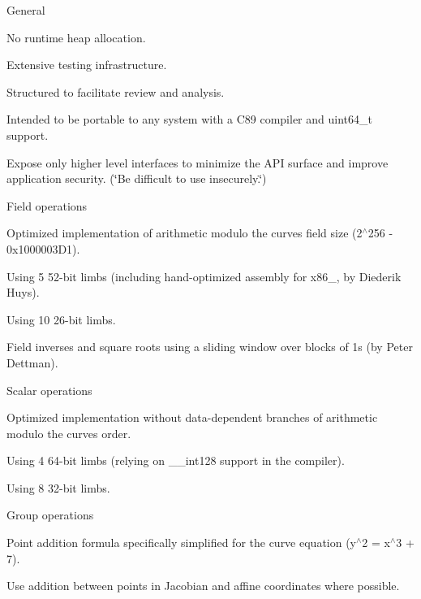 \begin{DoxyItemize}
\item General
\begin{DoxyItemize}
\item No runtime heap allocation.
\item Extensive testing infrastructure.
\item Structured to facilitate review and analysis.
\item Intended to be portable to any system with a C89 compiler and uint64\+\_\+t support.
\item Expose only higher level interfaces to minimize the A\+P\+I surface and improve application security. (\char`\"{}\+Be difficult to use insecurely.\char`\"{})
\end{DoxyItemize}
\item Field operations
\begin{DoxyItemize}
\item Optimized implementation of arithmetic modulo the curve\textquotesingle{}s field size (2$^\wedge$256 -\/ 0x1000003\+D1).
\begin{DoxyItemize}
\item Using 5 52-\/bit limbs (including hand-\/optimized assembly for x86\+\_, by Diederik Huys).
\item Using 10 26-\/bit limbs.
\end{DoxyItemize}
\item Field inverses and square roots using a sliding window over blocks of 1s (by Peter Dettman).
\end{DoxyItemize}
\item Scalar operations
\begin{DoxyItemize}
\item Optimized implementation without data-\/dependent branches of arithmetic modulo the curve\textquotesingle{}s order.
\begin{DoxyItemize}
\item Using 4 64-\/bit limbs (relying on \+\_\+\+\_\+int128 support in the compiler).
\item Using 8 32-\/bit limbs.
\end{DoxyItemize}
\end{DoxyItemize}
\item Group operations
\begin{DoxyItemize}
\item Point addition formula specifically simplified for the curve equation (y$^\wedge$2 = x$^\wedge$3 + 7).
\item Use addition between points in Jacobian and affine coordinates where possible.

\end{DoxyItemize}
\end{DoxyItemize}
